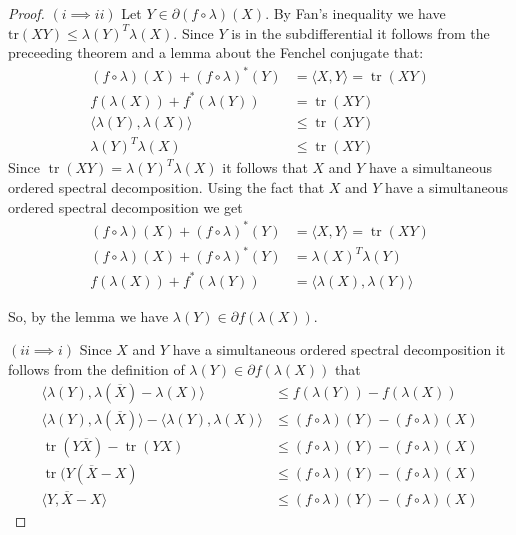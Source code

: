 \begin{proof}
\item $(i \implies ii)$ Let $Y \in \partial (f \circ \lambda)(X)$. By Fan's inequality we have $\mathrm{tr}(XY) \leq \lambda(Y)^T \lambda(X)$. Since $Y$ is in the subdifferential it follows from the preceeding theorem and a lemma about the Fenchel conjugate that:
\begin{align*}
(f \circ \lambda)(X) + (f \circ \lambda)^*(Y) &= \langle X, Y \rangle = \operatorname{tr}(XY) \\
f(\lambda(X)) + f^*(\lambda(Y)) &= \operatorname{tr}(XY) \\
\langle \lambda(Y), \lambda(X) \rangle &\leq \operatorname{tr}(XY) \\
\lambda(Y)^T \lambda(X) &\leq \operatorname{tr}(XY)
\end{align*}
Since $\operatorname{tr}(XY) = \lambda(Y)^T \lambda(X)$ it follows that $X$ and $Y$ have a simultaneous ordered spectral decomposition. Using the fact that $X$ and $Y$ have a simultaneous ordered spectral decomposition we get
\begin{align*}
(f \circ \lambda)(X) + (f \circ \lambda)^*(Y) &= \langle X, Y \rangle = \operatorname{tr}(XY) \\
(f \circ \lambda)(X) + (f \circ \lambda)^*(Y) &= \lambda(X)^T \lambda(Y) \\
f(\lambda(X)) + f^*(\lambda(Y)) &= \langle \lambda(X), \lambda(Y) \rangle
\end{align*}

So, by the lemma we have $\lambda(Y) \in \partial f(\lambda(X))$.

\item $(ii \implies i)$ Since $X$ and $Y$ have a simultaneous ordered spectral decomposition it follows from the definition of $\lambda(Y) \in \partial f(\lambda(X))$ that
\begin{align*}
\langle \lambda(Y), \lambda(\overline{X}) - \lambda(X) \rangle &\leq f(\lambda(Y)) - f(\lambda(X)) \\
\langle \lambda(Y), \lambda(\overline{X}) \rangle - \langle \lambda(Y), \lambda(X) \rangle &\leq (f \circ \lambda)(Y) - (f \circ \lambda)(X) \\
\operatorname{tr}(Y\overline{X}) - \operatorname{tr}(YX) &\leq (f \circ \lambda)(Y) - (f \circ \lambda)(X) \\
\operatorname{tr}(Y(\overline{X} - X) &\leq (f \circ \lambda)(Y) - (f \circ \lambda)(X) \\
\langle Y, \overline{X} - X \rangle &\leq (f \circ \lambda)(Y) - (f \circ \lambda)(X)
\end{align*}


\end{proof}
